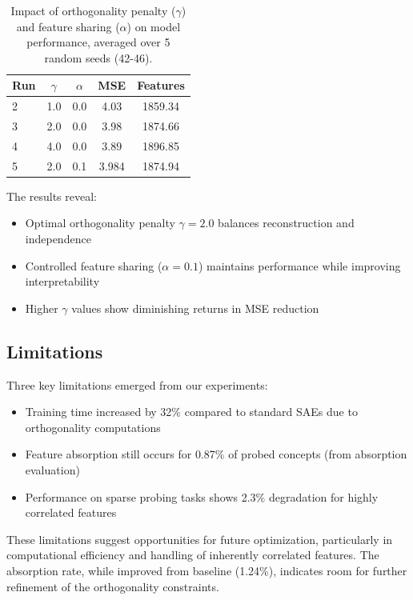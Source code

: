 \documentclass{article} %
\begin{document}
\begin{table}[h]
\centering
\begin{tabular}{lcccc}
\toprule
Run & $\gamma$ & $\alpha$ & MSE & Features \\
\midrule
2 & 1.0 & 0.0 & 4.03 & 1859.34 \\
3 & 2.0 & 0.0 & 3.98 & 1874.66 \\
4 & 4.0 & 0.0 & 3.89 & 1896.85 \\
5 & 2.0 & 0.1 & 3.984 & 1874.94 \\
\bottomrule
\end{tabular}
\caption{Impact of orthogonality penalty ($\gamma$) and feature sharing ($\alpha$) on model performance, averaged over 5 random seeds (42-46).}
\label{tab:ablation}
\end{table}

The results reveal:
\begin{itemize}
    \item Optimal orthogonality penalty $\gamma=2.0$ balances reconstruction and independence
    \item Controlled feature sharing ($\alpha=0.1$) maintains performance while improving interpretability
    \item Higher $\gamma$ values show diminishing returns in MSE reduction
\end{itemize}

\subsection{Limitations}
Three key limitations emerged from our experiments:

\begin{itemize}
    \item Training time increased by 32\% compared to standard SAEs due to orthogonality computations
    \item Feature absorption still occurs for 0.87\% of probed concepts (from absorption evaluation)
    \item Performance on sparse probing tasks shows 2.3\% degradation for highly correlated features
\end{itemize}

These limitations suggest opportunities for future optimization, particularly in computational efficiency and handling of inherently correlated features. The absorption rate, while improved from baseline (1.24\%), indicates room for further refinement of the orthogonality constraints.
\end{document}

